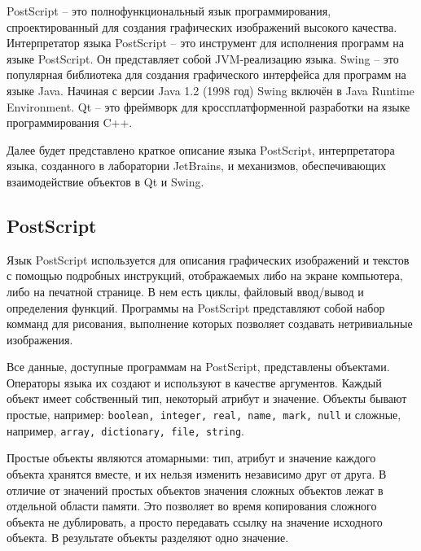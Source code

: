 \documentclass[14pt]{matmex-diploma}
\begin{document}
PostScript -- это полнофункциональный язык программирования, спроектированный для создания графических изображений высокого качества. %
Интерпретатор языка PostScript -- это инструмент для исполнения программ на языке PostScript. Он представляет собой JVM-реализацию языка. Swing -- это популярная библиотека для создания графического интерфейса для программ на языке Java. Начиная с версии Java 1.2 (1998 год) Swing включён в Java Runtime Environment. Qt -- это фреймворк для кроссплатформенной разработки на языке программирования C++. 

Далее будет представлено краткое описание языка PostScript, интерпретатора языка, созданного в лаборатории JetBrains, и механизмов, обеспечивающих взаимодействие объектов в Qt и Swing.


\subsection{PostScript}

Язык PostScript используется для описания графических изображений и текстов с помощью подробных инструкций, отображаемых либо на экране компьютера, либо на печатной странице. В нем есть циклы, файловый ввод/вывод и определения функций. Программы на PostScript представляют собой набор комманд для рисования, выполнение которых позволяет создавать нетривиальные изображения.

Все данные, доступные программам на PostScript, представлены объектами. Операторы языка их создают и используют в качестве аргументов. Каждый объект имеет собственный тип, некоторый атрибут и значение. 
Объекты бывают простые, например: \texttt{boolean, integer, real, name, mark, null} и сложные, например, \texttt{array, dictionary, file, string}.    

Простые объекты являются атомарными: тип, атрибут и значение каждого объекта хранятся вместе, и их нельзя изменить независимо друг от друга. В отличие от значений простых объектов значения сложных объектов лежат в отдельной области памяти. Это позволяет во время копирования сложного объекта не дублировать, а просто передавать ссылку на значение исходного объекта. В результате объекты разделяют одно значение.
\end{document}
